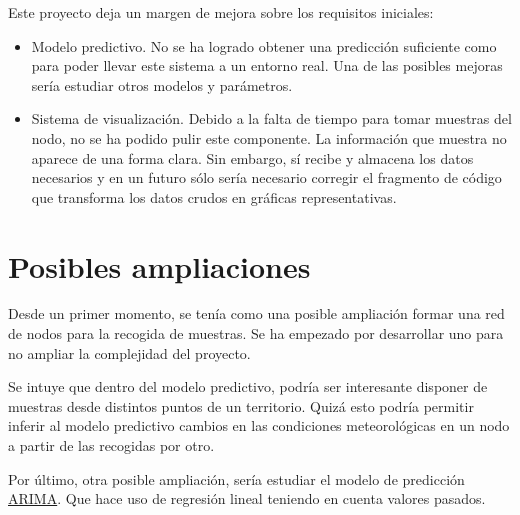 Este proyecto deja un margen de mejora sobre los requisitos iniciales:
\begin{itemize}
\item Modelo predictivo. No se ha logrado obtener una predicción suficiente como para poder llevar este sistema a un entorno real. Una de las posibles mejoras sería estudiar otros modelos y parámetros.

\item Sistema de visualización. Debido a la falta de tiempo para tomar muestras del nodo, no se ha podido pulir este componente. La información que muestra no aparece de una forma clara. Sin embargo, sí recibe y almacena los datos necesarios y en un futuro sólo sería necesario corregir el fragmento de código que transforma los datos crudos en gráficas representativas.
\end{itemize}

\section{Posibles ampliaciones}
Desde un primer momento, se tenía como una posible ampliación formar una red de nodos para la recogida de muestras. Se ha empezado por desarrollar uno para no ampliar la complejidad del proyecto.

Se intuye que dentro del modelo predictivo, podría ser interesante disponer de muestras desde distintos puntos de un territorio. Quizá esto podría permitir inferir al modelo predictivo cambios en las condiciones meteorológicas en un nodo a partir de las recogidas por otro.

Por último, otra posible ampliación, sería estudiar el modelo de predicción \href{https://www.analyticsvidhya.com/blog/2016/02/time-series-forecasting-codes-python/}{ARIMA}. Que hace uso de regresión lineal teniendo en cuenta valores pasados.